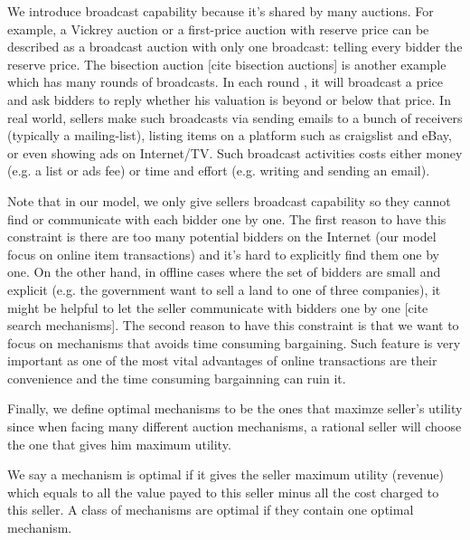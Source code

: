 We introduce broadcast capability because it's shared by many auctions.  For
example, a Vickrey auction or a first-price auction with reserve price can be
described as a broadcast auction with only one broadcast: telling every bidder
the reserve price. The bisection auction [cite bisection auctions] is another
example which has many rounds of broadcasts. In each round , it will broadcast
a price and ask bidders to reply whether his valuation is beyond or below that
price.  In real world, sellers make such broadcasts via sending emails to a
bunch of receivers (typically a mailing-list), listing items on a platform such
as craigslist and eBay, or even showing ads on Internet/TV. Such broadcast
activities costs either money (e.g. a list or ads fee) or time and effort (e.g.
writing and sending an email).

Note that in our model, we only give sellers broadcast capability so they
cannot find or communicate with each bidder one by one. The first reason to
have this constraint is there are too many potential bidders on the Internet
(our model focus on online item transactions) and it's hard to explicitly find
them one by one. On the other hand, in offline cases where the set of bidders
are small and explicit (e.g. the government want to sell a land to one of three
companies), it might be helpful to let the seller communicate with bidders one
by one [cite search mechanisms]. The second reason to have this constraint is
that we want to focus on mechanisms that avoids time consuming bargaining. Such
feature is very important as one of the most vital advantages of online
transactions are their convenience and the time consuming bargainning can ruin
it.

Finally, we define optimal mechanisms to be the ones that maximze seller's
utility since when facing many different auction mechanisms, a rational seller
will choose the one that gives him maximum utility.

\begin{definition}

We say a mechanism is optimal if it gives the seller maximum utility (revenue)
which equals to all the value payed to this seller minus all the cost charged
to this seller. A class of mechanisms are optimal if they contain one optimal
mechanism.

\end{definition}
